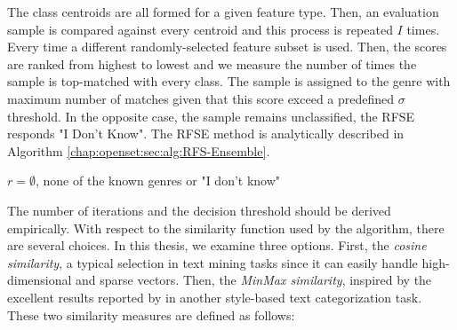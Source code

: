 The class centroids are all formed for a given feature type. Then, an evaluation sample is compared against every centroid and this process is repeated $I$ times. Every time a different randomly-selected feature subset is used. Then, the scores are ranked from highest to lowest and we measure the number of times the sample is top-matched with every class. The sample is assigned to the genre with maximum number of matches given that this score exceed a predefined $\sigma$ threshold. In the opposite case, the sample remains unclassified, the RFSE responds "I Don't Know". The RFSE method is analytically described in Algorithm \ref{chap:openset:sec:alg:RFS-Ensemble}. 

\hfill

\begin{algorithm}[t]
\caption{The \textit{RFSE} algorithm.}\label{chap:openset:sec:alg:RFS-Ensemble}

{
      $r = \emptyset$, none of the known genres or "I don't know"\;
}
\end{algorithm}

\hfill

The number of iterations and the decision threshold should be derived empirically. With respect to the similarity function used by the algorithm, there are several choices. In this thesis, we examine three options. First, the \textit{cosine similarity}, a typical selection in text mining tasks since it can easily handle high-dimensional and sparse vectors. Then, the \textit{MinMax similarity}, inspired by the excellent results reported by \parencite{koppel2014determining} in another style-based text categorization task. These two similarity measures are defined as follows:


